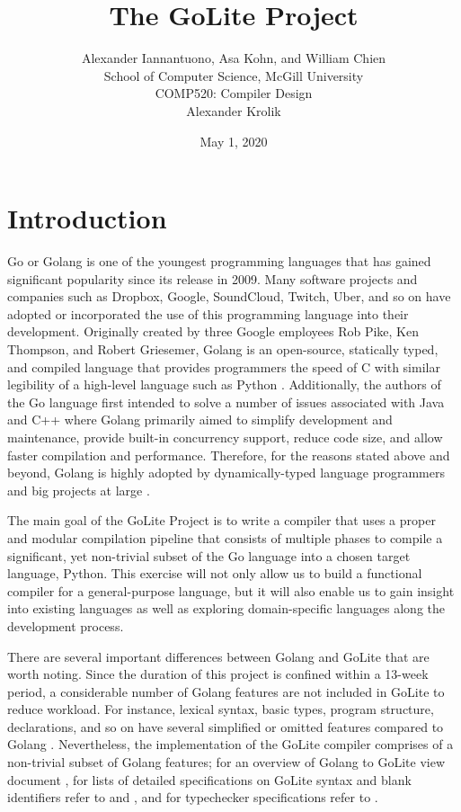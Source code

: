 \documentclass{article}
\title{The GoLite Project}
\author{Alexander Iannantuono, Asa Kohn, and William Chien\\
School of Computer Science, McGill University\\
COMP520: Compiler Design\\
Alexander Krolik}
\date{May 1, 2020}
\begin{document}
\maketitle

\section{Introduction}
Go or Golang is one of the youngest programming languages that has gained significant popularity since its release in 2009. Many software projects and companies such as Dropbox, Google, SoundCloud, Twitch, Uber, and so on have adopted or incorporated the use of this programming language into their development. Originally created by three Google employees Rob Pike, Ken Thompson, and Robert Griesemer, Golang is an open-source, statically typed, and compiled language that provides programmers the speed of C with similar legibility of a high-level language such as Python \citep{gospec, MattCompanies, VincentGoLite}. Additionally, the authors of the Go language first intended to solve a number of issues associated with Java and C++ where Golang primarily aimed to simplify development and maintenance, provide built-in concurrency support, reduce code size, and allow faster compilation and performance. Therefore, for the reasons stated above and beyond, Golang is highly adopted by dynamically-typed language programmers and big projects at large \citep{MattCompanies, VincentGoLite}.

The main goal of the GoLite Project is to write a compiler that uses a proper and modular compilation pipeline that consists of multiple phases to compile a significant, yet non-trivial subset of the Go language into a chosen target language, Python. This exercise will not only allow us to build a functional compiler for a general-purpose language, but it will also enable us to gain insight into existing languages as well as exploring domain-specific languages along the development process. 

There are several important differences between Golang and GoLite that are worth noting. Since the duration of this project is confined within a 13-week period, a considerable number of Golang features are not included in GoLite to reduce workload. For instance, lexical syntax, basic types, program structure, declarations, and so on have several simplified or omitted features compared to Golang \citep{VincentGoLite, AlexBlankSpecs, VincentSyntaxSpecs, VincentTypecheckSpecs}. Nevertheless, the implementation of the GoLite compiler comprises of a non-trivial subset of Golang features; for an overview of Golang to GoLite view document \cite{VincentGoLite}, for lists of detailed specifications on GoLite syntax and blank identifiers refer to \cite{VincentSyntaxSpecs} and \cite{AlexBlankSpecs}, and for typechecker specifications refer to \cite{VincentTypecheckSpecs}.
\end{document}
